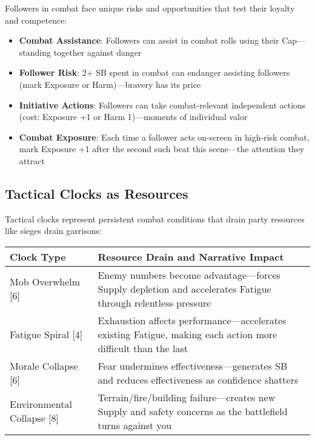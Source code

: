 Followers in combat face unique risks and opportunities that test their loyalty and competence:

\begin{itemize}
    \item \textbf{Combat Assistance}: Followers can assist in combat rolls using their Cap—standing together against danger
    \item \textbf{Follower Risk}: 2+ SB spent in combat can endanger assisting followers (mark Exposure or Harm)—bravery has its price
    \item \textbf{Initiative Actions}: Followers can take combat-relevant independent actions (cost: Exposure +1 or Harm 1)—moments of individual valor
    \item \textbf{Combat Exposure}: Each time a follower acts on-screen in high-risk combat, mark Exposure +1 after the second such beat this scene—the attention they attract
\end{itemize}

\subsection*{Tactical Clocks as Resources}

Tactical clocks represent persistent combat conditions that drain party resources like sieges drain garrisons:

\begin{fatebox}
\begin{tabularx}{\textwidth}{lX}
\toprule
\textbf{Clock Type} & \textbf{Resource Drain and Narrative Impact} \\
\midrule
Mob Overwhelm [6] & Enemy numbers become advantage—forces Supply depletion and accelerates Fatigue through relentless pressure \\
Fatigue Spiral [4] & Exhaustion affects performance—accelerates existing Fatigue, making each action more difficult than the last \\
Morale Collapse [6] & Fear undermines effectiveness—generates SB and reduces effectiveness as confidence shatters \\
Environmental Collapse [8] & Terrain/fire/building failure—creates new Supply and safety concerns as the battlefield turns against you \\
\bottomrule
\end{tabularx}
\end{fatebox}


